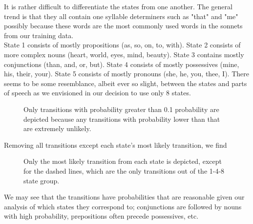 \documentclass[11pt]{article}
\newcommand*\circled[1]{\tikz[baseline=(char.base)]{\node[shape=circle,draw,inner sep=2pt] (char) {#1};}}
\begin{document}
\noindent It is rather difficult to differentiate the states from one another. The general trend is that they all contain one syllable determiners such as "that" and "me" possibly because these words are the most commonly used words in the sonnets from our training data. \\

\noindent State 1 consists of mostly propositions (as, so, on, to, with). State 2 consists of more complex nouns (heart, world, eyes, mind, beauty). State 3 contains mostly conjunctions (than, and, or, but). State 4 consists of mostly possessives (mine, his, their, your). State 5 consists of mostly pronouns (she, he, you, thee, I). There seems to be some resemblance, albeit ever so slight, between the states and parts of speech as we envisioned in our decision to use only 8 states.

\begin{figure}[H]
\centering
{}
\caption{Only transitions with probability greater than 0.1 probability are depicted because any transitions with probability lower than that are extremely unlikely.}
\end{figure}

\noindent Removing all transitions except each state's most likely transition, we find
\begin{figure}[H]
\centering
{}
\caption{Only the most likely transition from each state is depicted, except for the dashed lines, which are the only transitions out of the 1-4-8 state group.}
\end{figure}
\noindent We may see that the transitions have probabilities that are reasonable given our analysis of which states they correspond to; conjunctions are followed by nouns with high probability, prepositions often precede possessives, etc.
\end{document}
